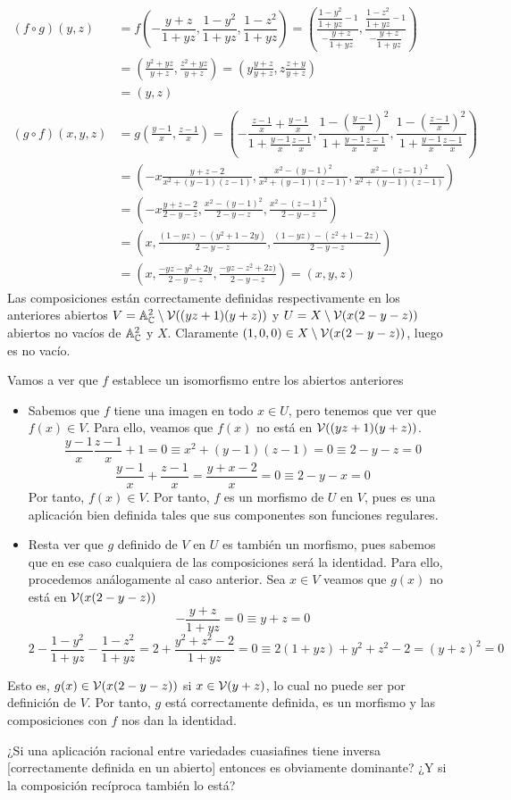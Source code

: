 \documentclass[twoside]{article}
\begin{document}
\begin{solucion}
\begin{align*}
(f\circ g)(y,z) &= f\left(-\dfrac{y+z}{1+yz},\dfrac{1-y^2}{1+yz},\dfrac{1-z^2}{1+yz}\right) = \left( \frac{\dfrac{1-y^2}{1+yz}-1}{-\dfrac{y+z}{1+yz}},\frac{\dfrac{1-z^2}{1+yz}-1}{-\dfrac{y+z}{1+yz}}\right) \\
&=  \left( \frac{{y^2}+yz}{y+z},\frac{{z^2}+yz}{y+z}\right) =   \left( y\frac{{y}+z}{y+z},z\frac{{z}+y}{y+z}\right)\\
&= (y,z)\\ \\
(g\circ f)(x,y,z)& = g\left(\frac{y-1}{x},\frac{z-1}{x}\right) =\left(-\dfrac{\frac{z-1}{x}+\frac{y-1}{x}}{1+\frac{y-1}{x}\frac{z-1}{x}},\dfrac{1-\left(\frac{y-1}{x}\right)^2}{1+\frac{y-1}{x}\frac{z-1}{x}},\dfrac{1-\left(\frac{z-1}{x}\right)^2}{1+\frac{y-1}{x}\frac{z-1}{x}}\right) \\
&= \left(-x\frac{y+z-2}{x^2+(y-1)(z-1)},\frac{x^2-(y-1)^2}{x^2+(y-1)(z-1)},\frac{x^2-(z-1)^2}{x^2+(y-1)(z-1)}\right)\\
&=\left(-x\frac{y+z-2}{2 -y-z},\frac{x^2-(y-1)^2}{2 -y-z},\frac{x^2-(z-1)^2}{2 -y-z}\right)\\
&= \left(x,\frac{(1-yz)-(y^2+1-2y)}{2 -y-z},\frac{(1-yz)-(z^2+1-2z)}{2 -y-z}\right)\\
&= \left(x,\frac{-yz-y^2+2y}{2 -y-z},\frac{-yz-z^2+2z)}{2 -y-z}\right)=(x,y,z)
\end{align*}
Las composiciones están correctamente definidas respectivamente en los anteriores abiertos $V=\mathbb{A}^2_{\mathbb{C}}\setminus \mathcal{V}((yz+1)(y+z))$ y $U=X\setminus\mathcal{V}(x(2-y-z))$ abiertos no vacíos de $\mathbb{A}^2_{\mathbb{C}}$ y $X$. Claramente $(1,0,0)\in X\setminus\mathcal{V}(x(2-y-z))$, luego es no vacío. 

Vamos a ver que $f$ establece un isomorfismo entre los abiertos anteriores
\begin{itemize}
\item Sabemos que $f$ tiene una imagen en todo $x\in U$, pero tenemos que ver que $f(x)\in V$. Para ello, veamos que $f(x)$ no está en $\mathcal{V}((yz+1)(y+z))$.
$$
\frac{y-1}{x}\frac{z-1}{x} + 1 = 0 \equiv x^2 + (y-1)(z-1) = 0 \equiv 2-y-z = 0
$$
$$
\frac{y-1}{x}+\frac{z-1}{x} = \frac{y+x-2}{x} = 0 \equiv 2-y-x = 0
$$
Por tanto, $f(x)\in V$. Por tanto, $f$ es un morfismo de $U$ en $V$, pues es una aplicación bien definida tales que sus componentes son funciones regulares. 
\item Resta ver que $g$ definido de $V$ en $U$ es también un morfismo, pues sabemos que en ese caso cualquiera de las composiciones será la identidad. Para ello, procedemos análogamente al caso anterior. Sea $x\in V$ veamos que $g(x)$ no está en $\mathcal{V}(x(2-y-z))$
$$
-\frac{y+z}{1+yz} = 0 \equiv y+z = 0
$$
$$
2-\frac{1-y^2}{1+yz}-\frac{1-z^2}{1+yz} = 2 + \frac{y^2+z^2-2}{1+yz} =0 \equiv 2(1+yz) +y^2 +z^2 -2 = (y+z)^2 = 0 
$$
\end{itemize}
Esto es, $g(x)\in \mathcal{V}(x(2-y-z))$ si $x\in \mathcal{V}(y+z)$, lo cual no puede ser por definición de $V$. Por tanto, $g$ está correctamente definida, es un morfismo y las composiciones con $f$ nos dan la identidad. 

\end{solucion}

\begin{nota}
¿Si una aplicación racional entre variedades cuasiafines tiene inversa [correctamente definida en un abierto] entonces es obviamente dominante? ¿Y si la composición recíproca también lo está?
\end{nota}
\end{document}
